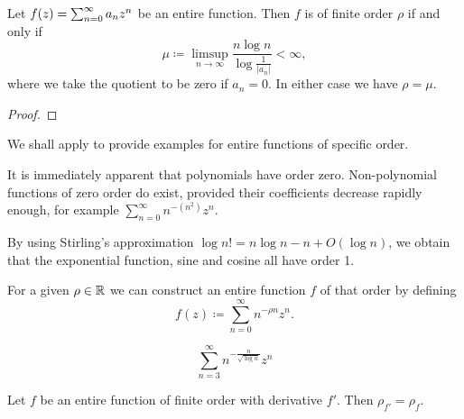 \begin{theorem} \label{thm:order-power-series}
    Let $f(z) = \sum_{n=0}^\infty {a_n}z^{n}$ be an entire function. Then $f$ is of finite order $\rho$ if and only if
    $$ \mu \coloneqq \limsup_{n \to \infty} \frac{n \log n}{\log \frac{1}{\vert a_n \vert}} < \infty, $$
    where we take the quotient to be zero if $a_n = 0$. In either case we have $\rho = \mu$.
\end{theorem}

\begin{proof}
\end{proof}

\begin{example} \label{exm:examples-orders}

    We shall apply  to provide examples for entire functions of specific order.
    
    It is immediately apparent that polynomials have order zero. Non-polynomial functions of zero order do exist, provided their coefficients decrease rapidly enough, for example $ \sum_{n=0}^\infty n^{-(n^2)} z^n $.

    By using Stirling's approximation $ \log n! = n \log n - n + O(\log n) $, we obtain that the exponential function, sine and cosine all have order 1.

    For a given $\rho \in \mathbb{R}$ we can construct an entire function $f$ of that order by defining
    $$ f(z) \coloneqq \sum_{n=0}^\infty n^{- \rho n} z^n. $$

    $$ \sum_{n=3}^\infty n^{- \frac{n}{\sqrt{\log n}}} z^n $$
\end{example}



\begin{proposition} \label{prop:order-derivative}
    Let $f$ be an entire function of finite order with derivative $f'$. Then $\rho_{f'} = \rho_f$.
\end{proposition}

